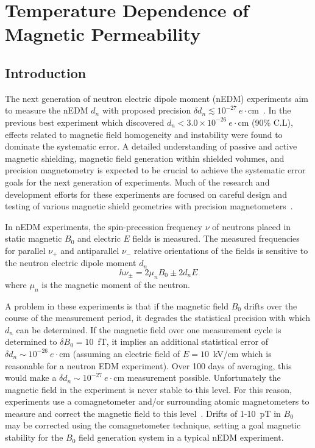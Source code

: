 \chapter{Temperature Dependence of Magnetic Permeability\label{chap:muofT}}


\section{Introduction}

The next generation of neutron electric dipole moment (nEDM)
experiments aim to measure the nEDM $d_n$ with proposed precision
$\delta d_n\lesssim
10^{-27}~e\cdot$cm~\cite{serebrov2014new,serebrov2011supersource,Kirch_talk,baker2011search,altarev2012next,golub1994neutron,ito2007plans,picker2017minuscule}.
In the previous best experiment \cite{baker2006,Pendlebury2015} which
discovered $d_n<3.0\times 10^{-26}~e\cdot$cm (90\% C.L), effects
related to magnetic field homogeneity and instability were found to
dominate the systematic error.  A detailed understanding of passive
and active magnetic shielding, magnetic field generation within
shielded volumes, and precision magnetometry is expected to be crucial
to achieve the systematic error goals for the next generation of
experiments.  Much of the research and development efforts for these
experiments are focused on careful design and testing of various
magnetic shield geometries with precision
magnetometers~\cite{brys2005magnetic,afach2014dynamic,altarev2014magnetically,Sturm_thesis,patton2014all}.

In nEDM experiments, the spin-precession frequency $\nu$ of neutrons
placed in static magnetic $B_0$ and electric $E$ fields is measured.
The measured frequencies for parallel $\nu_+$ and antiparallel $\nu_-$
relative orientations of the fields is sensitive to the neutron
electric dipole moment $d_n$
\begin{equation}
h\nu_\pm=2\mu_nB_0\pm 2d_nE
\end{equation}
where $\mu_n$ is the magnetic moment of the neutron.

A problem in these experiments is that if the magnetic field $B_0$
drifts over the course of the measurement period, it degrades the
statistical precision with which $d_n$ can be determined.  If the
magnetic field over one measurement cycle is determined to
$\delta B_0=10$~fT, it implies an additional statistical error of
$\delta d_n\sim 10^{-26}~e\cdot$cm (assuming an electric field of
$E=10$~kV/cm which is reasonable for a neutron EDM experiment).  Over
100 days of averaging, this would make a
$\delta d_n\sim 10^{-27}~e\cdot$cm measurement possible.
Unfortunately the magnetic field in the experiment is never stable to
this level.  For this reason, experiments use a comagnetometer and/or
surrounding atomic magnetometers to measure and correct the magnetic
field to this
level~\cite{baker2006,brys2005magnetic,afach2014dynamic}.  Drifts of
1-10~pT in $B_0$ may be corrected using the comagnetometer technique,
setting a goal magnetic stability for the $B_0$ field generation
system in a typical nEDM experiment.

